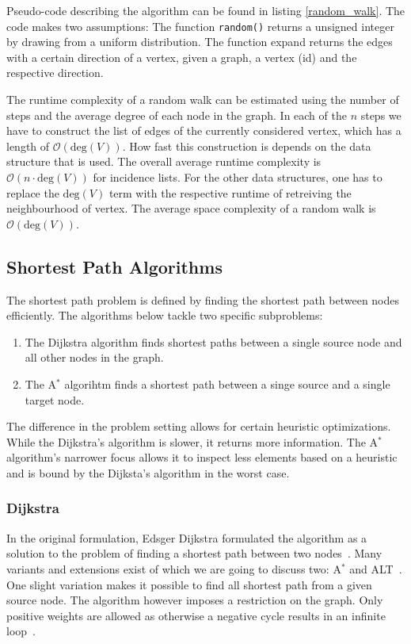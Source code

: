                Pseudo-code describing the algorithm can be found in listing \ref{random_walk}. 
                The code makes two assumptions: The function \texttt{random()} returns a unsigned integer by drawing from a uniform distribution. 
                The function expand returns the edges with a certain direction of a vertex, given a graph, a vertex (id) and the respective direction.
                
                The runtime complexity of a random walk can be estimated using the number of steps and the average degree of each node in the graph. 
                In each of the $n$ steps we have to construct the list of edges of the currently considered vertex, which has a length of $\mathcal{O}(\text{deg}(V))$. 
                How fast this construction is depends on the data structure that is used. 
                The overall average runtime complexity is $\mathcal{O}(n \cdot \text{deg}(V))$ for incidence lists. 
                For the other data structures, one has to replace the $\text{deg}(V)$ term with the respective runtime of retreiving the neighbourhood of vertex. 
                The average space complexity of a random walk is $\mathcal{O}(\text{deg}(V))$.
        
    \subsection{Shortest Path Algorithms}
        The shortest path problem is defined by finding the shortest path between nodes efficiently.
        The algorithms below tackle two specific subproblems:
        \begin{enumerate}
         \item The Dijkstra algorithm finds shortest paths between a single source node and all other nodes in the graph.
         \item The A$^*$ algorihtm finds a shortest path between a singe source and a single target node.
        \end{enumerate}
        The difference in the problem setting allows for certain heuristic optimizations. 
        While the Dijkstra's algorithm is slower, it returns more information.
        The A$^*$ algorithm's narrower focus allows it to inspect less elements based on a heuristic and is bound by the Dijksta's algorithm in the worst case.

        \subsubsection*{Dijkstra} 
            In the original formulation, Edsger Dijkstra formulated the algorithm as a solution to the problem of finding a shortest path between two nodes~\autocite{dijkstra1959note}. 
            Many variants and extensions exist of which we are going to discuss two: A$^*$ and ALT~\autocite{hart1968formal, goldberg2005computing}. 
            One slight variation makes it possible to find all shortest path from a given source node.
            The algorithm however imposes a restriction on the graph.
            Only positive weights are allowed as otherwise a negative cycle results in an infinite loop~\autocite{cormen2009introduction}. 
            
